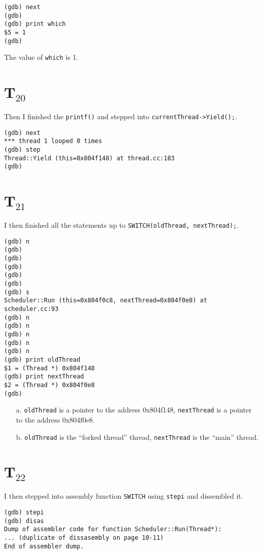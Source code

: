 \documentclass[letterpaper, 10pt]{article}
\begin{document}
	\begin{verbatim}
(gdb) next
(gdb)
(gdb) print which
$5 = 1
(gdb)
	\end{verbatim}

	The value of {\tt which} is 1.

	\section*{T$_{20}$}

	Then I finished the {\tt printf()} and stepped into {\tt currentThread->Yield();}.

	\begin{verbatim}
(gdb) next
*** thread 1 looped 0 times
(gdb) step
Thread::Yield (this=0x804f148) at thread.cc:183
(gdb)
	\end{verbatim}

	\section*{T$_{21}$}

	I then finished all the statements up to {\tt SWITCH(oldThread, nextThread);}.

	\begin{verbatim}
(gdb) n
(gdb)
(gdb)
(gdb)
(gdb)
(gdb)
(gdb) s
Scheduler::Run (this=0x804f0c8, nextThread=0x804f0e8) at scheduler.cc:93
(gdb) n
(gdb) n
(gdb) n
(gdb) n
(gdb) n
(gdb) print oldThread
$1 = (Thread *) 0x804f148
(gdb) print nextThread
$2 = (Thread *) 0x804f0e8
(gdb)
	\end{verbatim}

	\begin{itemize}
		\item[a.]{
		{\tt oldThread} is a pointer to the address 0x804f148, {\tt nextThread} is a pointer to the address 0x804f0e8.
		}
		\item[b.]{
		{\tt oldThread} is the ``forked thread'' thread, {\tt nextThread} is the ``main'' thread.
		}
	\end{itemize}

	\section*{T$_{22}$}

	I then stepped into assembly function {\tt SWITCH} using {\tt stepi} and dissembled it.

	\begin{verbatim}
(gdb) stepi
(gdb) disas
Dump of assembler code for function Scheduler::Run(Thread*):
... (duplicate of dissasembly on page 10-11)
End of assembler dump.
	\end{verbatim}
\end{document}
